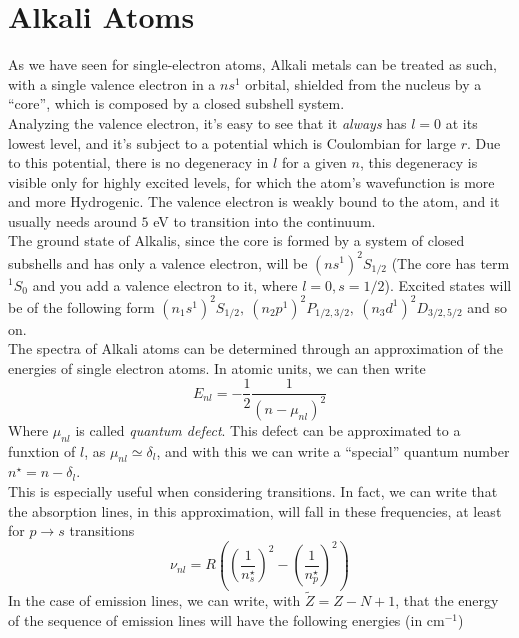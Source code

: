 \documentclass[a4paper, 11pt]{book}
\newcommand{\1}{\opr{\mathds{1}}}
\newcommand{\term}[3][]{^{#3}#2_{#1}}
\theoremstyle{plain}
\begin{document}
	\section{Alkali Atoms}
	As we have seen for single-electron atoms, Alkali metals can be treated as such, with a single valence electron in a $ns^1$ orbital, shielded from the nucleus by a ``core'', which is composed by a closed subshell system.\\
	Analyzing the valence electron, it's easy to see that it \emph{always} has $l=0$ at its lowest level, and it's subject to a potential which is Coulombian for large $r$. Due to this potential, there is no degeneracy in $l$ for a given $n$, this degeneracy is visible only for highly excited levels, for which the atom's wavefunction is more and more Hydrogenic. The valence electron is weakly bound to the atom, and it usually needs around $5$ eV to transition into the continuum.\\
	The ground state of Alkalis, since the core is formed by a system of closed subshells and has only a valence electron, will be $(ns^1) ^2S_{1/2}$ (The core has term $^1S_0$ and you add a valence electron to it, where $l=0,s=1/2$). Excited states will be of the following form $(n_1s^1)^2S_{1/2},\ (n_2p^1)\term[1/2,3/2]{P}{2},\ (n_3d^1)\term[3/2,5/2]{D}{2}$ and so on.\\
	The spectra of Alkali atoms can be determined through an approximation of the energies of single electron atoms. In atomic units, we can then write
	\begin{equation}
		E_{nl}=-\frac{1}{2}\frac{1}{(n-\mu_{nl})^2}
		\label{eq:quantumdef}
	\end{equation}
	Where $\mu_{nl}$ is called \textit{quantum defect}. This defect can be approximated to a funxtion of $l$, as $\mu_{nl}\simeq\delta_l$, and with this we can write a ``special'' quantum number $n^{\star}=n-\delta_l$.\\
	This is especially useful when considering transitions. In fact, we can write that the absorption lines, in this approximation, will fall in these frequencies, at least for $p\to s$ transitions
	\begin{equation}
		\nu_{nl}=R\left( \left( \frac{1}{n^{\star}_{s}} \right)^2-\left( \frac{1}{n^{\star}_{p}} \right)^2 \right)
		\label{eq:ptostransitionsapprox}
	\end{equation}
	In the case of emission lines, we can write, with $\tilde{Z}=Z-N+1$, that the energy of the sequence of emission lines will have the following energies (in $\mathrm{cm^{-1}}$)
\end{document}
